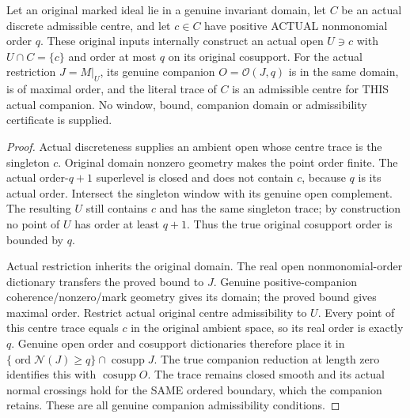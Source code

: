 \begin{theorem}
\label{hir:original-discrete-positive-actual-companion-window}
\leanok
Let an original marked ideal lie in a genuine invariant domain, let $C$
be an actual discrete admissible centre, and let $c\in C$ have positive
ACTUAL nonmonomial order $q$. These original inputs internally construct
an actual open $U\ni c$ with $U\cap C=\{c\}$ and order at most $q$ on
its original cosupport. For the actual restriction $J=M|_U$, its genuine
companion $O=\mathcal O(J,q)$ is in the same domain, is of maximal order,
and the literal trace of $C$ is an admissible centre for THIS actual
companion. No window, bound, companion domain or admissibility certificate
is supplied.
\end{theorem}
\begin{proof}
Actual discreteness supplies an ambient open whose centre trace is the
singleton $c$. Original domain nonzero geometry makes the point order
finite. The actual order-$q+1$ superlevel is closed and does not contain
$c$, because $q$ is its actual order. Intersect the singleton window with
its genuine open complement. The resulting $U$ still contains $c$ and
has the same singleton trace; by construction no point of $U$ has order
at least $q+1$. Thus the true original cosupport order is bounded by $q$.

Actual restriction inherits the original domain. The real open
nonmonomial-order dictionary transfers the proved bound to $J$. Genuine
positive-companion coherence/nonzero/mark geometry gives its domain;
the proved bound gives maximal order. Restrict actual original centre
admissibility to $U$. Every point of this centre trace equals $c$ in the
original ambient space, so its real order is exactly $q$. Genuine open
order and cosupport dictionaries therefore place it in
$\{\operatorname{ord}\mathcal N(J)\ge q\}\cap\operatorname{cosupp}J$.
The true companion reduction at length zero identifies this with
$\operatorname{cosupp}O$. The trace remains closed smooth and its actual
normal crossings hold for the SAME ordered boundary, which the companion
retains. These are all genuine companion admissibility conditions.
\end{proof}

